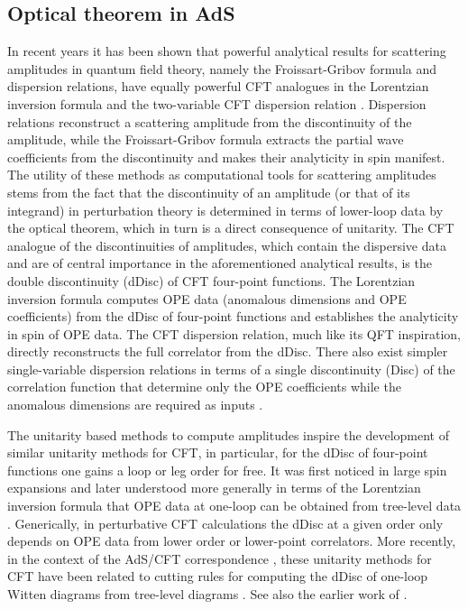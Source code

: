 \subsection*{Optical theorem in AdS}
In recent years it has been shown that powerful analytical results for scattering amplitudes in quantum field theory, namely the Froissart-Gribov formula and dispersion relations, have equally powerful CFT analogues in the Lorentzian inversion formula \cite{Caron-Huot:2017vep,Karateev:2018oml,Kravchuk:2018htv,Lemos:2017vnx,Liendo:2019jpu} and the two-variable CFT dispersion relation \cite{Carmi:2019cub,Caron-Huot:2020adz}. Dispersion relations reconstruct a scattering amplitude from the discontinuity of the amplitude, while the Froissart-Gribov formula extracts the partial wave coefficients from the discontinuity and makes their analyticity in spin manifest. The utility of these methods as computational tools for scattering amplitudes stems from the fact that the discontinuity of an amplitude (or that of its integrand) in perturbation theory is determined in terms of lower-loop data by the optical theorem, which in turn is a direct consequence of unitarity.
The CFT analogue of the discontinuities of amplitudes, which contain the dispersive data and are of central importance in the aforementioned analytical results, is the double discontinuity (dDisc) of CFT four-point functions. The Lorentzian inversion formula
computes OPE data (anomalous dimensions and OPE coefficients) from the dDisc of four-point functions and establishes the analyticity in spin of OPE data. The CFT dispersion relation, much like its QFT inspiration, directly reconstructs the full correlator from the dDisc. There also exist simpler single-variable dispersion relations in terms of a single discontinuity (Disc) of the correlation function that determine only the OPE coefficients while the anomalous dimensions are required as inputs \cite{Bissi:2019kkx}.

The unitarity based methods to compute amplitudes  inspire the development of  similar unitarity methods for CFT, in particular,
for the dDisc of four-point functions one gains a loop or leg order for free.
It was first noticed in large spin expansions \cite{Alday:2016njk,Alday:2016jfr,Aharony:2016dwx} and later understood more generally in terms of the Lorentzian inversion formula
that OPE data at one-loop can be obtained from tree-level data \cite{Alday:2017vkk,Alday:2017zzv}. Generically, in perturbative CFT calculations the dDisc at a given order only depends on OPE data from lower order or lower-point correlators. More recently, in the context of the AdS/CFT correspondence \cite{Maldacena:1997re,Witten:1998qj,Gubser:1998bc},
these unitarity methods for CFT have been related to cutting rules for computing the dDisc of one-loop Witten diagrams \cite{Liu:2018jhs} from tree-level diagrams \cite{Ponomarev:2019ofr,Meltzer:2019nbs,Meltzer:2020qbr}.
See also the earlier work of \cite{Fitzpatrick:2011dm}.

